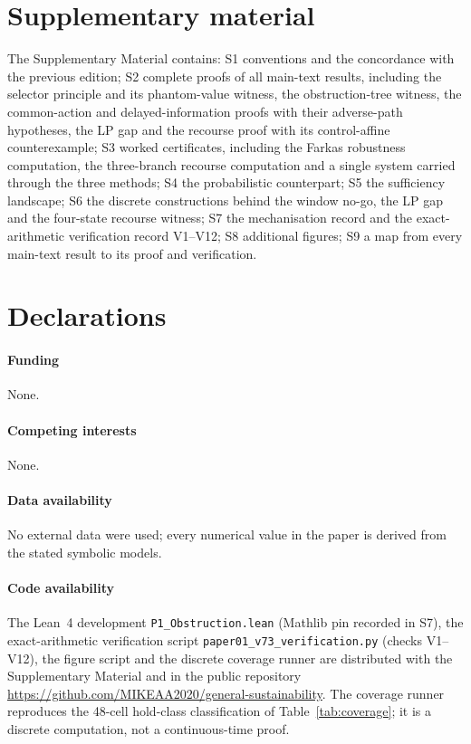 \section*{Supplementary material}
The Supplementary Material contains: S1 conventions and the concordance with the previous edition; S2 complete proofs of all main-text results, including the selector principle and its phantom-value witness, the obstruction-tree witness, the common-action and delayed-information proofs with their adverse-path hypotheses, the LP gap and the recourse proof with its control-affine counterexample; S3 worked certificates, including the Farkas robustness computation, the three-branch recourse computation and a single system carried through the three methods; S4 the probabilistic counterpart; S5 the sufficiency landscape; S6 the discrete constructions behind the window no-go, the LP gap and the four-state recourse witness; S7 the mechanisation record and the exact-arithmetic verification record V1--V12; S8 additional figures; S9 a map from every main-text result to its proof and verification.

\section*{Declarations}
\paragraph{Funding} None.
\paragraph{Competing interests} None.
\paragraph{Data availability} No external data were used; every numerical value in the paper is derived from the stated symbolic models.
\paragraph{Code availability} The Lean~4 development \texttt{P1\_Obstruction.lean} (Mathlib pin recorded in S7), the exact-arithmetic verification script \texttt{paper01\_v73\_verification.py} (checks V1--V12), the figure script and the discrete coverage runner are distributed with the Supplementary Material and in the public repository \url{https://github.com/MIKEAA2020/general-sustainability}. The coverage runner reproduces the 48-cell hold-class classification of Table~\ref{tab:coverage}; it is a discrete computation, not a continuous-time proof.
